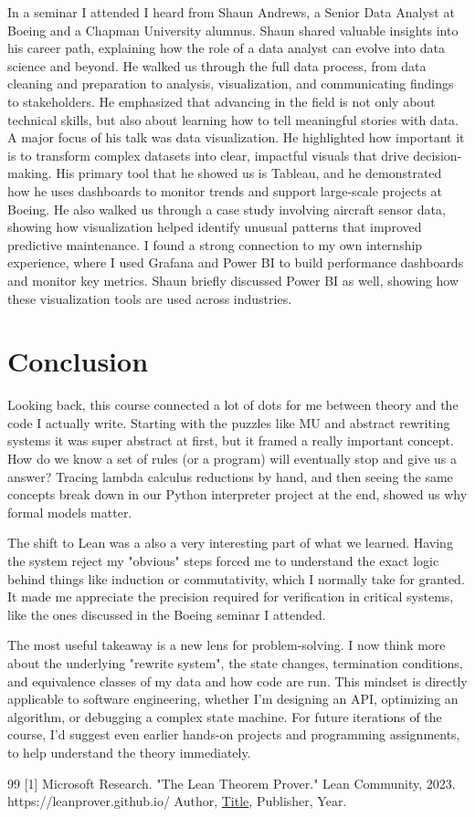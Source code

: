 \documentclass{article}
\theoremstyle{theorem}
\theoremstyle{definition}
\theoremstyle{remark}
\begin{document}
In a seminar I attended I heard from Shaun Andrews, a Senior Data Analyst at Boeing and a Chapman University alumnus. Shaun shared valuable insights into his career path, explaining how the role of a data analyst can evolve into data science and beyond. He walked us through the full data process, from data cleaning and preparation to analysis, visualization, and communicating findings to stakeholders. He emphasized that advancing in the field is not only about technical skills, but also about learning how to tell meaningful stories with data.
A major focus of his talk was data visualization. He highlighted how important it is to transform complex datasets into clear, impactful visuals that drive decision-making. His primary tool that he showed us is Tableau, and he demonstrated how he uses dashboards to monitor trends and support large-scale projects at Boeing. He also walked us through a case study involving aircraft sensor data, showing how visualization helped identify unusual patterns that improved predictive maintenance.
I found a strong connection to my own internship experience, where I used Grafana and Power BI to build performance dashboards and monitor key metrics. Shaun briefly discussed Power BI as well, showing how these visualization tools are used across industries.


\section{Conclusion}\label{conclusion}

Looking back, this course connected a lot of dots for me between theory and the code I actually write.
Starting with the puzzles like MU and abstract rewriting systems it was super abstract at first, but it framed a
really important concept. How do we know a set of rules (or a program) will eventually stop and give
us a answer? Tracing lambda calculus reductions by hand, and then seeing the same concepts break
down in our Python interpreter project at the end, showed us why formal models matter.

The shift to Lean was a also a very interesting part of what we learned.
Having the system reject my "obvious" steps forced me to understand the exact logic behind things
like induction or commutativity, which I normally take for granted. It made me appreciate the precision
required for verification in critical systems, like the ones discussed in the Boeing seminar I attended.

The most useful takeaway is a new lens for problem-solving. I now think more about
the underlying "rewrite system", the state changes, termination conditions, and equivalence classes of my
data and how code are run. This mindset is directly applicable to software engineering, whether I'm designing an API, optimizing
an algorithm, or debugging a complex state machine. For future iterations of the course, I'd suggest even
earlier hands-on projects and programming assignments, to help understand the theory immediately.

\begin{thebibliography}{99}
[1] Microsoft Research. "The Lean Theorem Prover." Lean Community, 2023. https://leanprover.github.io/
 Author, \href{https://en.wikipedia.org/wiki/LaTeX}{Title}, Publisher, Year.
\end{thebibliography}
\end{document}
